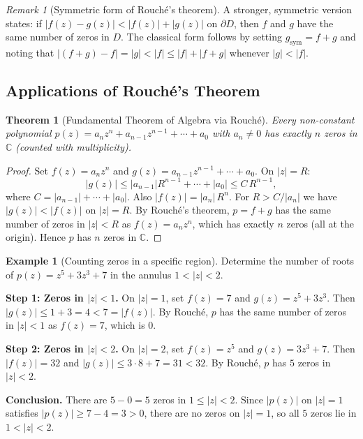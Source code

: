 \documentclass[12pt,a4paper,openany]{book}
\theoremstyle{definition}
\newtheorem{example}[definition]{Example}
\theoremstyle{plain}
\newtheorem{theorem}[definition]{Theorem}
\theoremstyle{remark}
\newtheorem{remark}[definition]{Remark}
\newcommand{\C}{\mathbb{C}}
\newcommand{\abs}[1]{\left|#1\right|}
\begin{document}
\begin{remark}[Symmetric form of Rouch\'{e}'s theorem]\label{rem:rouche-symmetric}
A stronger, symmetric version states: if $\abs{f(z) - g(z)} < \abs{f(z)} + \abs{g(z)}$
on $\partial D$, then $f$ and $g$ have the same number of zeros in $D$.
The classical form follows by setting $g_{\text{sym}} = f + g$ and noting
that $\abs{(f+g) - f} = \abs{g} < \abs{f} \leq \abs{f} + \abs{f+g}$ whenever
$\abs{g} < \abs{f}$.
\end{remark}

\subsection{Applications of Rouch\'{e}'s Theorem}

\begin{theorem}[Fundamental Theorem of Algebra via Rouch\'{e}]\label{thm:FTA-rouche}
Every non-constant polynomial $p(z) = a_n z^n + a_{n-1}z^{n-1} + \cdots + a_0$
with $a_n \neq 0$ has exactly $n$ zeros in $\C$ (counted with multiplicity).
\end{theorem}

\begin{proof}
Set $f(z) = a_n z^n$ and $g(z) = a_{n-1}z^{n-1} + \cdots + a_0$. On
$\abs{z} = R$:
\[
  \abs{g(z)} \leq \abs{a_{n-1}} R^{n-1} + \cdots + \abs{a_0}
  \leq C\, R^{n-1},
\]
where $C = \abs{a_{n-1}} + \cdots + \abs{a_0}$. Also
$\abs{f(z)} = \abs{a_n}\, R^n$. For $R > C/\abs{a_n}$ we have
$\abs{g(z)} < \abs{f(z)}$ on $\abs{z} = R$. By Rouch\'{e}'s theorem,
$p = f + g$ has the same number of zeros in $\abs{z} < R$ as $f(z) = a_n z^n$,
which has exactly $n$ zeros (all at the origin). Hence $p$ has $n$ zeros
in $\C$.
\end{proof}

\begin{example}[Counting zeros in a specific region]\label{ex:rouche-counting}
Determine the number of roots of $p(z) = z^5 + 3z^3 + 7$ in the
annulus $1 < \abs{z} < 2$.

\textbf{Step 1: Zeros in $\abs{z} < 1$.}
On $\abs{z} = 1$, set $f(z) = 7$ and $g(z) = z^5 + 3z^3$.
Then $\abs{g(z)} \leq 1 + 3 = 4 < 7 = \abs{f(z)}$.
By Rouch\'{e}, $p$ has the same number of zeros in $\abs{z} < 1$ as
$f(z) = 7$, which is $0$.

\textbf{Step 2: Zeros in $\abs{z} < 2$.}
On $\abs{z} = 2$, set $f(z) = z^5$ and $g(z) = 3z^3 + 7$.
Then $\abs{f(z)} = 32$ and $\abs{g(z)} \leq 3 \cdot 8 + 7 = 31 < 32$.
By Rouch\'{e}, $p$ has $5$ zeros in $\abs{z} < 2$.

\textbf{Conclusion.} There are $5 - 0 = 5$ zeros in $1 \leq \abs{z} < 2$.
Since $\abs{p(z)}$ on $\abs{z} = 1$ satisfies $\abs{p(z)} \geq 7 - 4 = 3 > 0$,
there are no zeros on $\abs{z} = 1$, so all $5$ zeros lie in $1 < \abs{z} < 2$.
\end{example}
\end{document}
